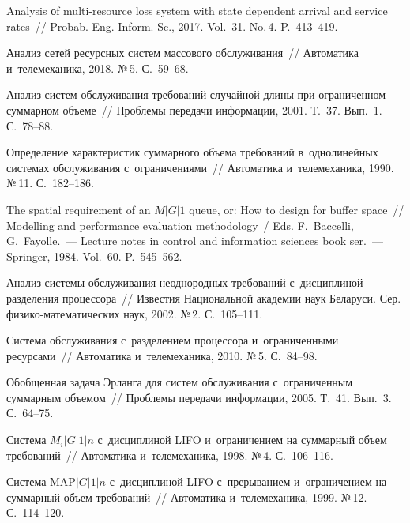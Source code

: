 \begin{multicols}{2}
{{\begin{thebibliography}{99}
Analysis оf multi-resource loss system with state dependent arrival and service 
rates~// {Probab. Eng. Inform. Sc.}, 2017. 
Vol.~31. No.\,4. P.~413--419.

Анализ сетей ресурсных сис\-тем массового обслуживания~// {Автоматика 
и~телемеханика}, 2018. №\,5. С.~59--68.

Анализ сис\-тем обслуживания требований случайной длины при ограниченном суммарном 
объеме~// {Проб\-ле\-мы передачи информации}, 2001. Т.~37. Вып.~1. С.~78--88.

Определение характеристик суммарного объема требований в~однолинейных сис\-те\-мах 
обслуживания с~ограничениями~// {Автоматика и~телемеханика}, 1990. №\,11. С.~182--186.

The spatial requirement of an $M|G|1$ queue, or: How to design for buffer space~// 
{Modelling and performance evaluation methodology}~/
Eds. F.~Baccelli, G.~Fayolle.~--- Lecture notes in control and information sciences book
ser.~--- Springer, 1984. Vol.~60. P.~545--562.

Анализ сис\-те\-мы обслуживания неоднородных требований с~дисциплиной разделения 
процессора~// {Известия Национальной академии наук Беларуси. Сер. 
фи\-зи\-ко-ма\-те\-ма\-ти\-че\-ских наук}, 2002. №\,2. С.~105--111.

Система обслуживания с~разделением процессора и~ограниченными ресурсами~// 
{Автоматика и~телемеханика}, 2010. №\,5. С.~84--98.

Обобщенная задача Эрланга для сис\-тем обслуживания с~ограниченным суммарным 
объемом~// {Проб\-ле\-мы передачи информации}, 2005. Т.~41. Вып.~3. С.~64--75.



Система $M_i|G|1|n$ с~дисциплиной \mbox{LIFO} и~ограничением на суммарный объем 
требований~// {Автоматика и~телемеханика}, 1998. №\,4. С.~106--116.

Система $\mathrm{MAP}|G|1|n$ с~дисциплиной LIFO с~прерыванием и~ограничением на 
суммарный объем требований~// {Автоматика и~телемеханика}, 1999. №\,12. С.~114--120.


\end{thebibliography}}}
\end{multicols}
